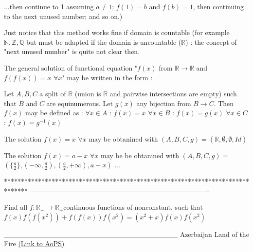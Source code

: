 \begin{solution}
	\begin{tcolorbox}...then continue to 1 assuming $a \neq 1$; $f(1) = b$ and $f(b) = 1$, then continuing to the next unused number; and so on.)\end{tcolorbox}
Just notice that this method works fine if domain is countable (for example $\mathbb N,\mathbb Z,\mathbb Q$ but must be adapted if the domain is uncountable ($\mathbb R$) : the concept of "next unused number" is quite not clear then.

The general solution of functional equation "$f(x)$ from $\mathbb R\to\mathbb R$ and $f(f(x))=x$ $\forall x$" may be written in the form :

Let $A,B,C$ a split of $\mathbb R$ (union is $\mathbb R$ and pairwise intersections are empty) such that $B$ and $C$ are equinumerous.
Let $g(x)$ any bijection from $B\to C$.
Then $f(x)$ may be defined as :
$\forall x\in A$ : $f(x)=x$
$\forall x\in B$ : $f(x)=g(x)$
$\forall x\in C$ : $f(x)=g^{-1}(x)$

The solution $f(x)=x$ $\forall x$ may be obtanined with $(A,B,C,g)=(\mathbb R,\emptyset,\emptyset, Id)$

The solution $f(x)=a-x$ $\forall x$ may be be obtanined with $(A,B,C,g)=$ $(\{\frac a2\},(-\infty,\frac a2),(\frac a2,+\infty),a-x)$
...
\end{solution}
*******************************************************************************
-------------------------------------------------------------------------------

\begin{problem}
	Find all $f: \mathbb{R_+}\to\mathbb{R_+}$continuous functions of nonconstant, such that
$f(x)f(f(x^2))+f(f(x))f(x^2)=(x^2+x)f(x)f(x^2)$


__________________________________
Azerbaijan Land of the Fire 
	\flushright \href{https://artofproblemsolving.com/community/c6h478421}{(Link to AoPS)}
\end{problem}




